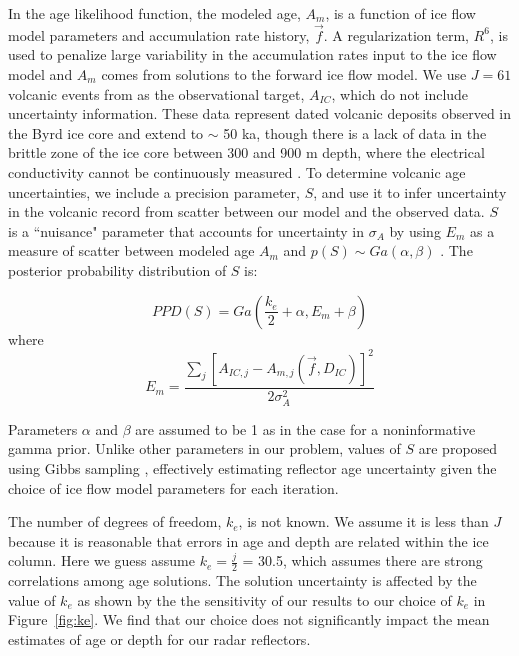 In the age likelihood function, the modeled age, $A_m$, is a function of ice flow model parameters and accumulation rate history, $\vec{f}$. A regularization term, $R^6$, is used to penalize large variability in the accumulation rates input to the ice flow model and $A_m$ comes from solutions to the forward ice flow model. We use $J=61$ volcanic events from \citet{hammer1997} as the observational target, $A_{IC}$, which do not include uncertainty information. These data represent dated volcanic deposits observed in the Byrd ice core and extend to $\sim$ 50 ka, though there is a lack of data in the brittle zone of the ice core between 300 and 900 m depth, where the electrical conductivity cannot be continuously measured \citep{hammer1997}. To determine volcanic age uncertainties, we include a precision parameter, $S$, and use it to infer uncertainty in the volcanic record from scatter between our model and the observed data. $S$ is a ``nuisance" parameter that accounts for uncertainty in $\sigma_A$ by using $E_m$ as a measure of scatter between modeled age $A_m$ and $p(S) \sim Ga(\alpha,\beta)$ \citep{jackson&huerta2016}. The posterior probability distribution of $S$ is:

\begin{equation}\label{eqn:S}
PPD(S) = Ga(\frac{k_e}{2}+\alpha, E_m+\beta)
\end{equation}
where 
\begin{equation}
 E_m= \frac{\sum_{j}[A_{IC,j} - A_{m,j}(\vec{f},D_{IC})]^2}{2\sigma_A^2} 
\end{equation}

Parameters $\alpha$ and $\beta$ are assumed to be 1 as in the case for a noninformative gamma prior. Unlike other parameters in our problem, values of $S$ are proposed using Gibbs sampling \citep{gelfand1992}, effectively estimating reflector age uncertainty given the choice of ice flow model parameters for each iteration.

The number of degrees of freedom, $k_e$, is not known. We assume it is less than $J$ because it is reasonable that errors in age and depth are related within the ice column. Here we guess assume $k_e = \frac{j}{2}$ = 30.5, which assumes there are strong correlations among age solutions. The solution uncertainty is affected by the value of $k_e$ as shown by the the sensitivity of our results to our choice of $k_e$ in Figure~\ref{fig:ke}. We find that our choice does not significantly impact the mean estimates of age or depth for our radar reflectors. %

